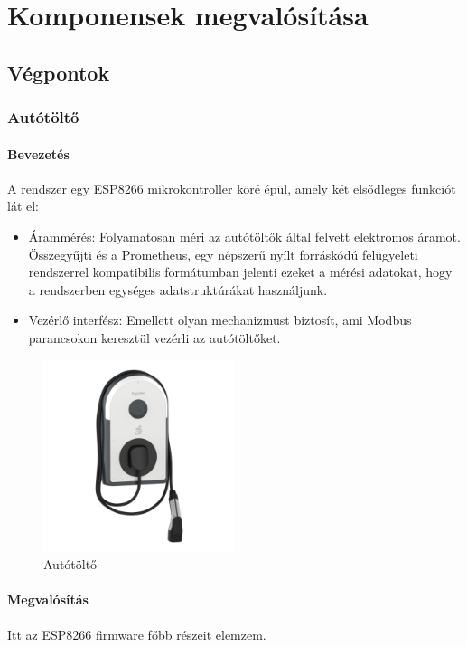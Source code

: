 \chapter{Komponensek megvalósítása}

\section{Végpontok}

\subsection{Autótöltő}

\subsubsection{Bevezetés}
A rendszer egy ESP8266 mikrokontroller köré épül, amely két elsődleges funkciót lát el:
\begin{itemize}
    \item Árammérés: Folyamatosan méri az autótöltők által felvett elektromos áramot. Összegyűjti és a Prometheus, 
    egy népszerű nyílt forráskódú felügyeleti rendszerrel kompatibilis formátumban jelenti ezeket a mérési adatokat, 
    hogy a rendszerben egységes adatstruktúrákat használjunk.
    \item Vezérlő interfész: Emellett olyan mechanizmust biztosít, ami Modbus parancsokon keresztül vezérli az 
    autótöltőket.
\end{itemize}

\begin{figure}[!ht]
    \centering
    \includegraphics[width=0.5\textwidth, keepaspectratio]{figures/EVLINK.png}
    \caption{Autótöltő \cite{SE:EVLINK}} 
\end{figure}

\subsubsection{Megvalósítás}
Itt az ESP8266 firmware főbb részeit elemzem.
